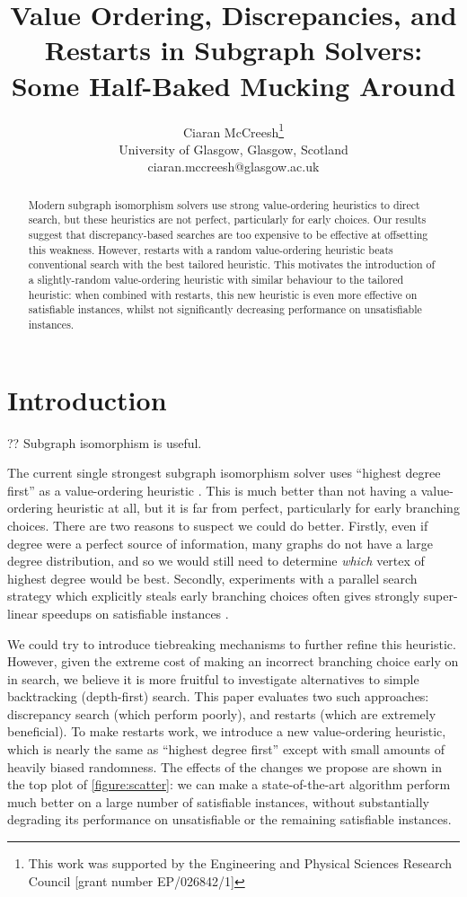 \documentclass{article}
\title{Value Ordering, Discrepancies, and Restarts in Subgraph Solvers: \\ Some Half-Baked Mucking
Around}
\author{Ciaran McCreesh\thanks{This work was supported by the Engineering and Physical Sciences
    Research Council [grant number EP/026842/1]}\\ University of Glasgow, Glasgow, Scotland \\
    ciaran.mccreesh@glasgow.ac.uk}
\newcommand{\citep}[1]{\cite{#1}}
\begin{document}
\maketitle

\begin{abstract}
    Modern subgraph isomorphism solvers use strong value-ordering heuristics to direct search, but
    these heuristics are not perfect, particularly for early choices. Our results suggest that
    discrepancy-based searches are too expensive to be effective at offsetting this weakness.
    However, restarts with a random value-ordering heuristic beats conventional search with the best
    tailored heuristic. This motivates the introduction of a slightly-random value-ordering
    heuristic with similar behaviour to the tailored heuristic: when combined with restarts, this
    new heuristic is even more effective on satisfiable instances, whilst not significantly
    decreasing performance on unsatisfiable instances.
\end{abstract}

\section{Introduction}

?? Subgraph isomorphism is useful.

The current single strongest subgraph isomorphism solver uses ``highest degree first'' as a
value-ordering heuristic \citep{dblp:conf/cp/McCreeshP15,dblp:conf/ijcai/McCreeshPT16}.  This is
much better than not having a value-ordering heuristic at all, but it is far from perfect,
particularly for early branching choices. There are two reasons to suspect we could do better.
Firstly, even if degree were a perfect source of information, many graphs do not have a large degree
distribution, and so we would still need to determine \emph{which} vertex of highest degree would be
best.  Secondly, experiments with a parallel search strategy which explicitly steals early branching
choices often gives strongly super-linear speedups on satisfiable instances
\citep{dblp:conf/cp/McCreeshP15}.

We could try to introduce tiebreaking mechanisms to further refine this heuristic. However, given
the extreme cost of making an incorrect branching choice early on in search, we believe it is more
fruitful to investigate alternatives to simple backtracking (depth-first) search. This paper
evaluates two such approaches: discrepancy search (which perform poorly), and restarts (which are
extremely beneficial). To make restarts work, we introduce a new value-ordering heuristic, which is
nearly the same as ``highest degree first'' except with small amounts of heavily biased randomness.
The effects of the changes we propose are shown in the top plot of \cref{figure:scatter}: we can
make a state-of-the-art algorithm perform much better on a large number of satisfiable instances,
without substantially degrading its performance on unsatisfiable or the remaining satisfiable
instances.
\end{document}

